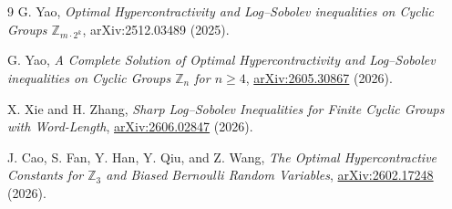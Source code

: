 \documentclass[11pt]{article}
\newcommand{\Z}{\mathbb Z}
\begin{document}
\begin{thebibliography}{9}
G. Yao, \emph{Optimal Hypercontractivity and Log--Sobolev inequalities on
Cyclic Groups \(\Z_{m\cdot2^k}\)}, arXiv:2512.03489 (2025).

G. Yao, \emph{A Complete Solution of Optimal Hypercontractivity and
Log--Sobolev inequalities on Cyclic Groups \(\Z_n\) for \(n\ge4\)},
\href{https://arxiv.org/abs/2605.30867}{arXiv:2605.30867} (2026).

X. Xie and H. Zhang, \emph{Sharp Log--Sobolev Inequalities for Finite Cyclic
Groups with Word-Length},
\href{https://arxiv.org/abs/2606.02847}{arXiv:2606.02847} (2026).

J. Cao, S. Fan, Y. Han, Y. Qiu, and Z. Wang,
\emph{The Optimal Hypercontractive Constants for \(\Z_3\) and Biased
Bernoulli Random Variables},
\href{https://arxiv.org/abs/2602.17248}{arXiv:2602.17248} (2026).
\end{thebibliography}
\end{document}
